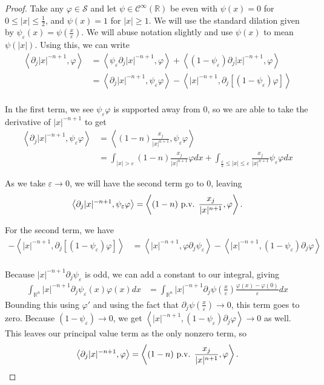 \documentclass[a4paper]{article}
\newcommand{\R}{\mathbb{R}}
\newcommand{\la}{\left \langle}
\newcommand{\ra}{\right \rangle}
\begin{document}
\begin{enumerate}
\begin{proof}
    Take any $\varphi \in \mathcal{S}$ and let $\psi \in \mathcal{C}^\infty(\R)$ be even with $\psi(x) = 0$ for $0 \leq |x| \leq \frac{1}{2}$, and $\psi(x) = 1$ for $|x| \geq 1$. We will
    use the standard dilation given by $\psi_\varepsilon(x) = \psi \left( \frac{x}{\varepsilon} \right)$. We will abuse notation slightly and use
    $\psi(x)$ to mean $\psi(|x|)$. Using this, we can write
    \begin{align*}
      \la \partial_j |x|^{-n+1} , \varphi \ra &= \la \psi_\varepsilon \partial_j |x|^{-n+1}, \varphi \ra + \la (1-\psi_\varepsilon) \partial_j |x|^{-n+1}, \varphi \ra \\
      &=  \la \partial_j |x|^{-n+1}, \psi_\varepsilon \varphi \ra - \la |x|^{-n+1}, \partial_j \left[ (1 - \psi_\varepsilon) \varphi \right] \ra \\
    \end{align*}

    In the first term, we see $\psi_\varepsilon \varphi$ is supported away from 0, so we are able to take the derivative of $|x|^{-n+1}$ to get
    \begin{align*}
      \la \partial_j |x|^{-n+1}, \psi_\varepsilon \varphi \ra &= \la (1-n) \frac{x_j}{|x|^{n+1}}, \psi_\varepsilon \varphi \ra \\
      &= \int_{|x|>\varepsilon}^{} (1-n) \frac{x_j}{|x|^{n+1}} \varphi dx + \int_{\frac{\varepsilon}{2} \leq |x| \leq \varepsilon}^{}
      \frac{x_j}{|x|^{n+1}} \psi_\varepsilon \varphi dx
    \end{align*}

    As we take $\varepsilon \to 0$, we will have the second term go to 0, leaving
    \[ \la \partial_j |x|^{-n+1}, \psi_\varepsilon \varphi \ra = \la (1-n) \textup{ p.v. } \frac{x_j}{|x|^{n+1}}, \varphi \ra .\]

    For the second term, we have
    \begin{align*}
      - \la |x|^{-n+1}, \partial_j \left[ (1-\psi_\varepsilon) \varphi \right] \ra &= \la |x|^{-n+1}, \varphi \partial_j \psi_\varepsilon \ra - \la
      |x|^{-n+1}, (1 - \psi_\varepsilon) \partial_j \varphi \ra \\
    \end{align*}

    Because $|x|^{-n+1} \partial_j \psi_\varepsilon$ is odd, we can add a constant to our integral, giving
    \begin{align*}
      \int_{\R^n}^{} |x|^{-n+1} \partial_j \psi_\varepsilon(x) \varphi(x) dx &= \int_{\R^n}^{} |x|^{-n+1} \partial_j \psi \left( \frac{x}{\varepsilon}
      \right) \frac{\varphi(x) - \varphi(0)}{\varepsilon} dx
    \end{align*}
    Bounding this using $\varphi'$ and using the fact that $\partial_j \psi \left( \frac{x}{\varepsilon} \right) \to 0$, this term goes to zero.
    Because $(1 - \psi_\varepsilon) \to 0$, we get $\la |x|^{-n+1}, (1 - \psi_\varepsilon) \partial_j \varphi \ra \to 0$ as well. This leaves our
    principal value term as the only nonzero term, so
    \[ \la \partial_j |x|^{-n+1}, \varphi \ra = \la (1-n) \textup{ p.v. } \frac{x_j}{|x|^{n+1}}, \varphi \ra .\]


\end{proof}
\end{enumerate}
\end{document}
